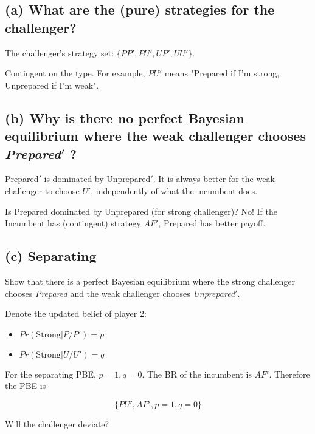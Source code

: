 \documentclass{article}
\begin{document}
\medskip

\subsection*{(a) What are the (pure) strategies for the challenger?} 


The challenger's strategy set: $\{PP', PU', UP', UU'\}$.

\begin{mdframed}[backgroundcolor=blue!20,linecolor=white]
Contingent on the type. For example, $PU'$ means "Prepared if I'm strong, Unprepared if I'm weak".
\end{mdframed}

\subsection*{(b) Why is there no perfect Bayesian equilibrium where the weak challenger chooses
\textit{Prepared}$'$ ? }

Prepared$'$ is dominated by Unprepared$'$.
It is always better for the weak challenger to choose $U'$, independently of
what the incumbent does.

\begin{mdframed}[backgroundcolor=blue!20,linecolor=white]
Is {Prepared} dominated by {Unprepared} (for strong challenger)?
No! If the Incumbent has (contingent) strategy $AF'$, Prepared has better payoff.
\end{mdframed}

\subsection*{(c) Separating}Show that there is a perfect Bayesian equilibrium where the strong challenger chooses
\textit{Prepared} and the weak challenger chooses \textit{Unprepared}$'$. 

Denote the updated belief of player 2:
\begin{itemize}
\item $Pr(\text{Strong} | P/P') = p$
\item $Pr(\text{Strong} | U/U') = q$
\end{itemize}

For the separating PBE, $p=1,q=0$. The BR of the incumbent is
$AF'$. Therefore the PBE is

$$\{PU',AF',p=1,q=0\}$$

\begin{mdframed}[backgroundcolor=blue!20,linecolor=white]
Will the challenger deviate?
\end{mdframed}
\end{document}
